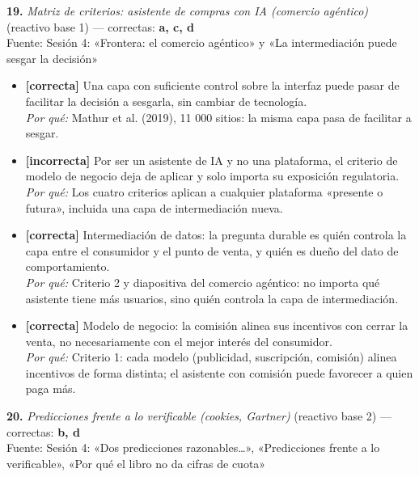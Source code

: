 \documentclass[10pt,letterpaper]{article}
\begin{document}
{\begin{itemize}[leftmargin=1.2em,itemsep=0pt,topsep=1pt,parsep=0pt]
\end{itemize}
\vspace{3pt}\noindent\textbf{19.} \textit{Matriz de criterios: asistente de compras con IA (comercio agéntico)} (reactivo base 1) — correctas: \textbf{a, c, d}\\[-1pt]
{\scriptsize Fuente: Sesión 4: «Frontera: el comercio agéntico» y «La intermediación puede sesgar la decisión»}
\begin{itemize}[leftmargin=1.2em,itemsep=0pt,topsep=1pt,parsep=0pt]
\item[\textbf{a)}] {\footnotesize \textbf{[correcta]} Una capa con suficiente control sobre la interfaz puede pasar de facilitar la decisión a sesgarla, sin cambiar de tecnología.\\ \textit{Por qué:} Mathur et al. (2019), 11 000 sitios: la misma capa pasa de facilitar a sesgar.}
\item[\textbf{b)}] {\footnotesize \textbf{[incorrecta]} Por ser un asistente de IA y no una plataforma, el criterio de modelo de negocio deja de aplicar y solo importa su exposición regulatoria.\\ \textit{Por qué:} Los cuatro criterios aplican a cualquier plataforma «presente o futura», incluida una capa de intermediación nueva.}
\item[\textbf{c)}] {\footnotesize \textbf{[correcta]} Intermediación de datos: la pregunta durable es quién controla la capa entre el consumidor y el punto de venta, y quién es dueño del dato de comportamiento.\\ \textit{Por qué:} Criterio 2 y diapositiva del comercio agéntico: no importa qué asistente tiene más usuarios, sino quién controla la capa de intermediación.}
\item[\textbf{d)}] {\footnotesize \textbf{[correcta]} Modelo de negocio: la comisión alinea sus incentivos con cerrar la venta, no necesariamente con el mejor interés del consumidor.\\ \textit{Por qué:} Criterio 1: cada modelo (publicidad, suscripción, comisión) alinea incentivos de forma distinta; el asistente con comisión puede favorecer a quien paga más.}
\end{itemize}
\vspace{3pt}\noindent\textbf{20.} \textit{Predicciones frente a lo verificable (cookies, Gartner)} (reactivo base 2) — correctas: \textbf{b, d}\\[-1pt]
{\scriptsize Fuente: Sesión 4: «Dos predicciones razonables…», «Predicciones frente a lo verificable», «Por qué el libro no da cifras de cuota»}
}
\end{document}
